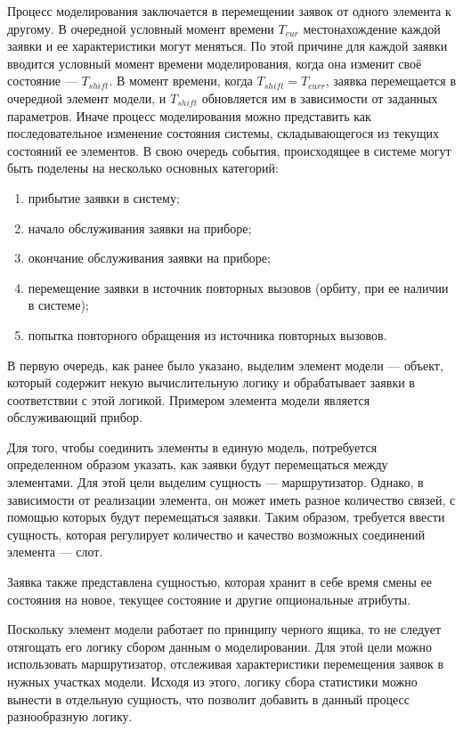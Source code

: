 Процесс моделирования заключается в перемещении заявок от одного элемента к другому. В очередной условный момент времени $T_{cur}$ местонахождение каждой заявки и ее характеристики могут меняться. По этой причине для каждой заявки вводится условный момент времени моделирования, когда она изменит своё состояние --- $T_{shift}$. В момент времени, когда $T_{shift} = T_{curr}$, заявка перемещается в очередной элемент модели, и  $T_{shift}$ обновляется им в зависимости от заданных параметров. Иначе процесс моделирования можно представить как последовательное изменение состояния системы, складывающегося из текущих состояний ее элементов. В свою очередь события, происходящее в системе могут быть поделены на несколько основных категорий:
\begin{enumerate}
	\item прибытие заявки в систему;
	\item начало обслуживания заявки на приборе;
	\item окончание обслуживания заявки на приборе;
	\item перемещение заявки в источник повторных вызовов (орбиту, при ее наличии в системе);
	\item попытка повторного обращения из источника повторных вызовов.
\end{enumerate}

В первую очередь, как ранее было указано, выделим элемент модели --- объект, который содержит некую вычислительную логику и обрабатывает заявки в соответствии с этой логикой. Примером элемента модели является обслуживающий прибор.

Для того, чтобы соединить элементы в единую модель, потребуется определенном образом указать, как заявки будут перемещаться между элементами. Для этой цели выделим сущность --- маршрутизатор. Однако, в зависимости от реализации элемента, он может иметь разное количество связей, с помощью которых будут перемещаться заявки. Таким образом, требуется ввести сущность, которая регулирует количество и качество возможных соединений элемента --- слот.

Заявка также представлена сущностью, которая хранит в себе время смены ее состояния на новое, текущее состояние и другие опциональные атрибуты.

Поскольку элемент модели работает по принципу черного ящика, то не следует отягощать его логику сбором данным о моделировании. Для этой цели можно использовать маршрутизатор, отслеживая характеристики перемещения заявок в нужных участках модели. Исходя из этого, логику сбора статистики можно вынести в отдельную сущность, что позволит добавить в данный процесс разнообразную логику.

